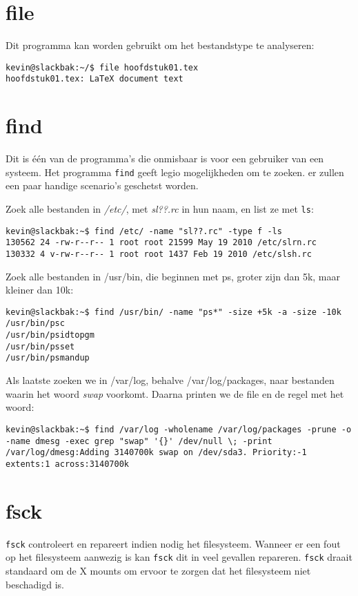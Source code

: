 \section{file}
Dit programma kan worden gebruikt om het bestandstype te analyseren:
\begin{lstlisting}
kevin@slackbak:~/$ file hoofdstuk01.tex 
hoofdstuk01.tex: LaTeX document text
\end{lstlisting}%

\section{find}
Dit is \'{e}\'{e}n van de programma's die onmisbaar is voor een gebruiker van een systeem. Het programma \texttt{find} geeft legio mogelijkheden om te zoeken. er zullen een paar handige scenario's geschetst worden. 

Zoek alle bestanden in \emph{/etc/}, met \emph{sl??.rc} in hun naam, en list ze met \texttt{ls}:
\begin{lstlisting}
kevin@slackbak:~$ find /etc/ -name "sl??.rc" -type f -ls
130562 24 -rw-r--r-- 1 root root 21599 May 19 2010 /etc/slrn.rc
130332 4 v-rw-r--r-- 1 root root 1437 Feb 19 2010 /etc/slsh.rc
\end{lstlisting}%

Zoek alle bestanden in /usr/bin, die beginnen met ps, groter zijn dan 5k, maar kleiner dan 10k: 
\begin{lstlisting}
kevin@slackbak:~$ find /usr/bin/ -name "ps*" -size +5k -a -size -10k
/usr/bin/psc
/usr/bin/psidtopgm
/usr/bin/psset
/usr/bin/psmandup
\end{lstlisting}%

Als laatste zoeken we in /var/log, behalve /var/log/packages, naar bestanden waarin het woord \emph{swap} voorkomt. Daarna printen we de file en de regel met het woord: 
\begin{lstlisting}
kevin@slackbak:~$ find /var/log -wholename /var/log/packages -prune -o -name dmesg -exec grep "swap" '{}' /dev/null \; -print
/var/log/dmesg:Adding 3140700k swap on /dev/sda3. Priority:-1 extents:1 across:3140700k 
\end{lstlisting}%

\section{fsck}
\texttt{fsck} controleert en repareert indien nodig het filesysteem. Wanneer er een fout op het filesysteem aanwezig is kan \texttt{fsck} dit in veel gevallen repareren. \texttt{fsck} draait standaard om de X mounts om ervoor te zorgen dat het filesysteem niet beschadigd is. 

